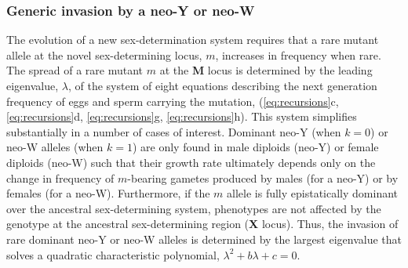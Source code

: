 \documentclass[12pt]{article}
\begin{document}

\subsubsection*{Generic invasion by a neo-Y or neo-W}

The evolution of a new sex-determination system requires that a rare mutant allele at the novel sex-determining locus, $m$, increases in frequency when rare. 
The spread of a rare mutant $m$ at the \textbf{M} locus is determined by the leading eigenvalue, $\lambda$, of the system of eight equations describing the next generation frequency of eggs and sperm carrying the mutation, (\ref{eq:recursions}c, \ref{eq:recursions}d, \ref{eq:recursions}g, \ref{eq:recursions}h). %
This system simplifies substantially in a number of cases of interest. 
Dominant neo-Y (when $k=0$) or neo-W alleles (when $k=1$) are only found in male diploids (neo-Y) or female diploids (neo-W) such that their growth rate ultimately depends only on the change in frequency of $m$-bearing gametes produced by males (for a neo-Y) or by females (for a neo-W). 
Furthermore, if the $m$ allele is fully epistatically dominant over the ancestral sex-determining system, phenotypes are not affected by the genotype at the ancestral sex-determining region (\textbf{X} locus). 
Thus, the invasion of rare dominant neo-Y or neo-W alleles is determined by the largest eigenvalue that solves a quadratic characteristic polynomial,
$\lambda^2+ b \lambda + c =0$.
%
\end{document}

